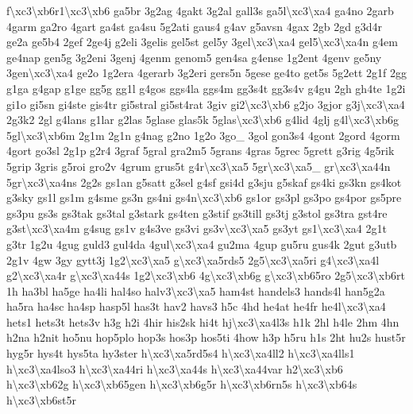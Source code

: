 {f\textbackslash{}xc3\textbackslash{}xb6r1\textbackslash{}xc3\textbackslash{}xb6 ga5br 3g2ag 4gakt 3g2al gall3s ga5l\textbackslash{}xc3\textbackslash{}xa4 ga4no 2garb 4garm ga2ro 4gart ga4st ga4su 5g2ati gaus4 g4av g5avsn 4gax 2gb 2gd g3d4r ge2a ge5b4 2gef 2ge4j g2eli 3gelis gel5st gel5y 3gel\textbackslash{}xc3\textbackslash{}xa4 gel5\textbackslash{}xc3\textbackslash{}xa4n g4em ge4nap gen5g 3g2eni 3genj 4genm genom5 gen4sa g4ense 1g2ent 4genv ge5ny 3gen\textbackslash{}xc3\textbackslash{}xa4 ge2o 1g2era 4gerarb 3g2eri gers5n 5gese ge4to get5s 5g2ett 2g1f 2gg g1ga g4gap g1ge gg5g gg1l g4gos ggs4la ggs4m gg3s4t gg3s4v g4gu 2gh gh4te 1g2i gi1o gi5sn gi4ste gis4tr gi5stral gi5st4rat 3giv gi2\textbackslash{}xc3\textbackslash{}xb6 g2jo 3gjor g3j\textbackslash{}xc3\textbackslash{}xa4 2g3k2 2gl g4lans g1lar g2las 5glase glas5k 5glas\textbackslash{}xc3\textbackslash{}xb6 g4lid 4glj g4l\textbackslash{}xc3\textbackslash{}xb6g 5gl\textbackslash{}xc3\textbackslash{}xb6m 2g1m 2g1n g4nag g2no 1g2o 3go\-\_\- 3gol gon3s4 4gont 2gord 4gorm 4gort go3sl 2g1p g2r4 3graf 5gral gra2m5 5grans 4gras 5grec 5grett g3rig 4g5rik 5grip 3gris g5roi gro2v 4grum grus5t g4r\textbackslash{}xc3\textbackslash{}xa5 5gr\textbackslash{}xc3\textbackslash{}xa5\-\_\- gr\textbackslash{}xc3\textbackslash{}xa44n 5gr\textbackslash{}xc3\textbackslash{}xa4ns 2g2s gs1an g5satt g3sel g4sf gsi4d g3sju g5skaf gs4ki gs3kn gs4kot g3sky gs1l gs1m g4sme gs3n gs4ni gs4n\textbackslash{}xc3\textbackslash{}xb6 gs1or gs3pl gs3po gs4por gs5pre gs3pu gs3s gs3tak gs3tal g3stark gs4ten g3stif gs3till gs3tj g3stol gs3tra gst4re g3st\textbackslash{}xc3\textbackslash{}xa4m g4sug gs1v g4s3ve gs3vi gs3v\textbackslash{}xc3\textbackslash{}xa5 gs3yt gs1\textbackslash{}xc3\textbackslash{}xa4 2g1t g3tr 1g2u 4gug guld3 gul4da 4gul\textbackslash{}xc3\textbackslash{}xa4 gu2ma 4gup gu5ru gus4k 2gut g3utb 2g1v 4gw 3gy gytt3j 1g2\textbackslash{}xc3\textbackslash{}xa5 g\textbackslash{}xc3\textbackslash{}xa5rds5 2g5\textbackslash{}xc3\textbackslash{}xa5ri g4\textbackslash{}xc3\textbackslash{}xa4l g2\textbackslash{}xc3\textbackslash{}xa4r g\textbackslash{}xc3\textbackslash{}xa44s 1g2\textbackslash{}xc3\textbackslash{}xb6 4g\textbackslash{}xc3\textbackslash{}xb6g g\textbackslash{}xc3\textbackslash{}xb65ro 2g5\textbackslash{}xc3\textbackslash{}xb6rt 1h ha3bl ha5ge ha4li hal4so halv3\textbackslash{}xc3\textbackslash{}xa5 ham4st handels3 hands4l han5g2a ha5ra ha4sc ha4sp hasp5l has3t hav2 havs3 h5c 4hd he4at he4fr he4l\textbackslash{}xc3\textbackslash{}xa4 hets1 hets3t hets3v h3g h2i 4hir his2sk hi4t hj\textbackslash{}xc3\textbackslash{}xa4l3s h1k 2hl h4le 2hm 4hn h2na h2nit ho5nu hop5plo hop3s hos3p hos5ti 4how h3p h5ru h1s 2ht hu2s hust5r hyg5r hys4t hys5ta hy3ster h\textbackslash{}xc3\textbackslash{}xa5rd5s4 h\textbackslash{}xc3\textbackslash{}xa4ll2 h\textbackslash{}xc3\textbackslash{}xa4lls1 h\textbackslash{}xc3\textbackslash{}xa4lso3 h\textbackslash{}xc3\textbackslash{}xa44ri h\textbackslash{}xc3\textbackslash{}xa44s h\textbackslash{}xc3\textbackslash{}xa44var h2\textbackslash{}xc3\textbackslash{}xb6 h\textbackslash{}xc3\textbackslash{}xb62g h\textbackslash{}xc3\textbackslash{}xb65gen h\textbackslash{}xc3\textbackslash{}xb6g5r h\textbackslash{}xc3\textbackslash{}xb6rn5s h\textbackslash{}xc3\textbackslash{}xb64s h\textbackslash{}xc3\textbackslash{}xb6st5r }
